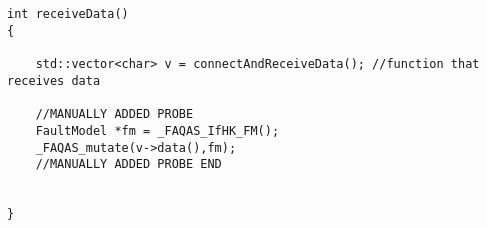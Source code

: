 
\begin{minipage}{15cm}
\begin{lstlisting}[style=CStyle, caption=Example of a data-driven mutation probes., label=probesExample, mathescape=true]


int receiveData()
{

    std::vector<char> v = connectAndReceiveData(); //function that receives data

    //MANUALLY ADDED PROBE
    FaultModel *fm = _FAQAS_IfHK_FM();
    _FAQAS_mutate(v->data(),fm);
    //MANUALLY ADDED PROBE END


}
\end{lstlisting}
\end{minipage}

